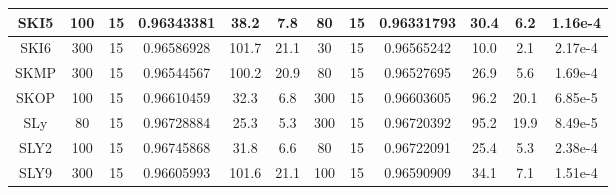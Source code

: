 \begin{table}[]
\begin{tabular}{@{}|c|ccccc|ccccc|c|@{}}
SKI5                   & \multicolumn{1}{c|}{100}            & \multicolumn{1}{c|}{15}             & \multicolumn{1}{c|}{0.96343381}     & \multicolumn{1}{c|}{38.2}        & 7.8             & \multicolumn{1}{c|}{80}             & \multicolumn{1}{c|}{15}             & \multicolumn{1}{c|}{0.96331793}     & \multicolumn{1}{c|}{30.4}        & 6.2             & 1.16e-4         \\ \midrule
SKI6                   & \multicolumn{1}{c|}{300}            & \multicolumn{1}{c|}{15}             & \multicolumn{1}{c|}{0.96586928}     & \multicolumn{1}{c|}{101.7}       & 21.1            & \multicolumn{1}{c|}{30}             & \multicolumn{1}{c|}{15}             & \multicolumn{1}{c|}{0.96565242}     & \multicolumn{1}{c|}{10.0}        & 2.1             & 2.17e-4         \\ \midrule
SKMP                   & \multicolumn{1}{c|}{300}            & \multicolumn{1}{c|}{15}             & \multicolumn{1}{c|}{0.96544567}     & \multicolumn{1}{c|}{100.2}       & 20.9            & \multicolumn{1}{c|}{80}             & \multicolumn{1}{c|}{15}             & \multicolumn{1}{c|}{0.96527695}     & \multicolumn{1}{c|}{26.9}        & 5.6             & 1.69e-4         \\ \midrule
SKOP                   & \multicolumn{1}{c|}{100}            & \multicolumn{1}{c|}{15}             & \multicolumn{1}{c|}{0.96610459}     & \multicolumn{1}{c|}{32.3}        & 6.8             & \multicolumn{1}{c|}{300}            & \multicolumn{1}{c|}{15}             & \multicolumn{1}{c|}{0.96603605}     & \multicolumn{1}{c|}{96.2}        & 20.1            & 6.85e-5         \\ \midrule
SLy                    & \multicolumn{1}{c|}{80}             & \multicolumn{1}{c|}{15}             & \multicolumn{1}{c|}{0.96728884}     & \multicolumn{1}{c|}{25.3}        & 5.3             & \multicolumn{1}{c|}{300}            & \multicolumn{1}{c|}{15}             & \multicolumn{1}{c|}{0.96720392}     & \multicolumn{1}{c|}{95.2}        & 19.9            & 8.49e-5         \\ \midrule
SLY2                   & \multicolumn{1}{c|}{100}            & \multicolumn{1}{c|}{15}             & \multicolumn{1}{c|}{0.96745868}     & \multicolumn{1}{c|}{31.8}        & 6.6             & \multicolumn{1}{c|}{80}             & \multicolumn{1}{c|}{15}             & \multicolumn{1}{c|}{0.96722091}     & \multicolumn{1}{c|}{25.4}        & 5.3             & 2.38e-4         \\ \midrule
SLY9                   & \multicolumn{1}{c|}{300}            & \multicolumn{1}{c|}{15}             & \multicolumn{1}{c|}{0.96605993}     & \multicolumn{1}{c|}{101.6}       & 21.1            & \multicolumn{1}{c|}{100}            & \multicolumn{1}{c|}{15}             & \multicolumn{1}{c|}{0.96590909}     & \multicolumn{1}{c|}{34.1}        & 7.1             & 1.51e-4         \\ \midrule

\end{tabular}
\end{table}
